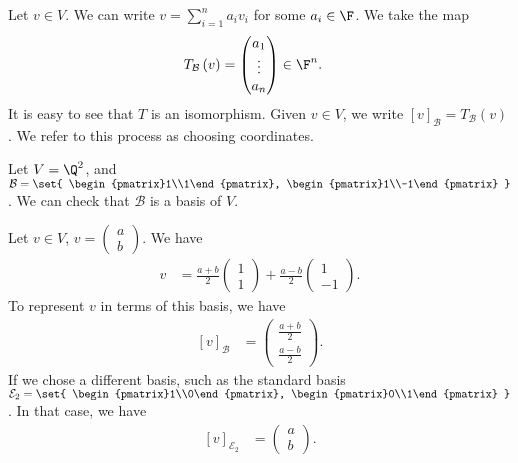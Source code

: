 \documentclass[10pt]{mypackage}
\begin{document}
Let $v\in V$. We can write $v = \sum_{i=1}^{n}a_iv_i$ for some $a_i\in \F$. We take the map
\begin{align*}
  T_{\mathcal{B}}\left(v\right) &= \begin{pmatrix}a_1\\\vdots\\a_n\end{pmatrix}\in \F^n.
\end{align*}
It is easy to see that $T$ is an isomorphism. Given $v\in V$, we write $\left[v\right]_{\mathcal{B}} = T_{\mathcal{B}}\left(v\right)$. We refer to this process as choosing coordinates.
\begin{example}
  Let $V = \Q^2$, and $\mathcal{B} = \set{ \begin{pmatrix}1\\1\end{pmatrix}, \begin{pmatrix}1\\-1\end{pmatrix} }$. We can check that $\mathcal{B}$ is a basis of $V$.\newline

  Let $v\in V$, $v = \begin{pmatrix}a\\b\end{pmatrix}$. We have
  \begin{align*}
    v &= \frac{a+b}{2} \begin{pmatrix}1\\1\end{pmatrix} + \frac{a-b}{2} \begin{pmatrix}1\\-1\end{pmatrix}.
  \end{align*}
  To represent $v$ in terms of this basis, we have
  \begin{align*}
    \left[v\right]_{\mathcal{B}} &= \begin{pmatrix}\frac{a+b}{2}\\\frac{a-b}{2}\end{pmatrix}.
  \end{align*}
  If we chose a different basis, such as the standard basis $\mathcal{E}_2 = \set{ \begin{pmatrix}1\\0\end{pmatrix}, \begin{pmatrix}0\\1\end{pmatrix} }$. In that case, we have
  \begin{align*}
    \left[v\right]_{\mathcal{E}_2} &= \begin{pmatrix}a\\b\end{pmatrix}.
  \end{align*}
\end{example}
\end{document}
